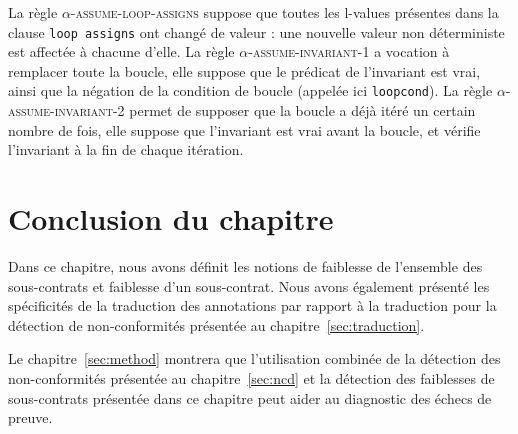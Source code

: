 La règle \textsc{$\alpha$-assume-loop-assigns} suppose que toutes les l-values
présentes dans la clause \lstinline'loop assigns' ont changé de valeur : une
nouvelle valeur non déterministe est affectée à chacune d'elle.
La règle \textsc{$\alpha$-assume-invariant-1} a vocation à remplacer toute la
boucle, elle suppose que le prédicat de l'invariant est vrai, ainsi que la
négation de la condition de boucle (appelée ici \lstinline'loopcond').
La règle \textsc{$\alpha$-assume-invariant-2} permet de supposer que la boucle
a déjà itéré un certain nombre de fois, elle suppose que l'invariant est vrai
avant la boucle, et vérifie l'invariant à la fin de chaque itération.


\section*{Conclusion du chapitre}


Dans ce chapitre, nous avons définit les notions de faiblesse de l'ensemble des
sous-contrats et faiblesse d'un sous-contrat.
Nous avons également présenté les spécificités de la traduction des annotations
par rapport à la traduction pour la détection de non-conformités présentée au
chapitre~\ref{sec:traduction}.

Le chapitre~\ref{sec:method} montrera que l'utilisation combinée de la détection
des non-conformités présentée au chapitre~\ref{sec:ncd} et la détection des
faiblesses de sous-contrats présentée dans ce chapitre peut aider au diagnostic
des échecs de preuve.
